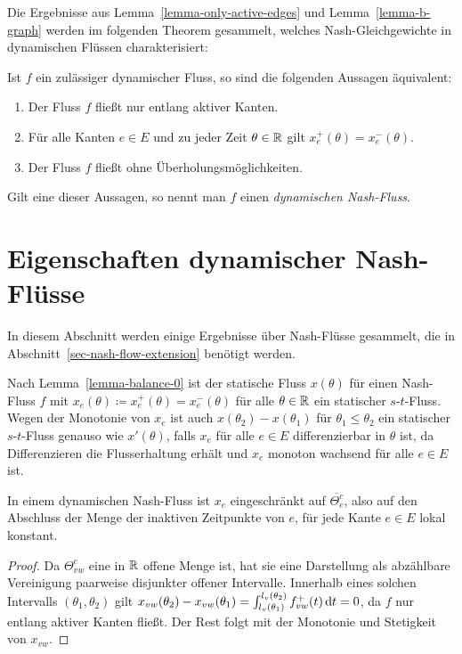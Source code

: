 Die Ergebnisse aus Lemma~\ref{lemma-only-active-edges} und Lemma~\ref{lemma-b-graph} werden im folgenden Theorem gesammelt, welches Nash-Gleichgewichte in dynamischen Flüssen charakterisiert:

\begin{theorem}\label{thm-equivalencies-nash-flow}
	Ist $f$ ein zu\-läs\-siger dynamischer Fluss, so sind die folgenden Aussagen äquivalent:
	\begin{enumerate}[label=(\roman*)]
		\item Der Fluss $f$ fließt nur entlang aktiver Kanten.
		\item Für alle Kanten $e\in E$ und zu jeder Zeit $\theta\in\mathbb{R}$ gilt $x_e^+(\theta) = x_e^-(\theta)$.
		\item Der Fluss $f$ fließt ohne Überholungsmöglichkeiten.
	\end{enumerate}
	Gilt eine dieser Aussagen, so nennt man $f$ einen \emph{dynamischen Nash-Fluss}.
\end{theorem}

\section{Eigenschaften dynamischer Nash-Flüsse}

In diesem Abschnitt werden einige Ergebnisse über Nash-Flüsse gesammelt, die in Abschnitt~\ref{sec-nash-flow-extension} benötigt werden.

\begin{remark}\label{remark-s-t-flow}
	Nach Lemma~\ref{lemma-balance-0} ist der statische Fluss $x(\theta)$ für einen Nash-Fluss $f$ mit $x_e(\theta)\coloneq x_e^+(\theta)=x_e^-(\theta)$ für alle $\theta\in\mathbb{R}$ ein statischer $s$-$t$-Fluss.
	Wegen der Monotonie von $x_e$ ist auch $x(\theta_2) - x(\theta_1)$ für $\theta_1 \leq \theta_2$ ein statischer $s$-$t$-Fluss genauso wie $x'(\theta)$, falls $x_e$ für alle $e\in E$ differenzierbar in $\theta$ ist, da Differenzieren die Flusserhaltung erhält und $x_e$ monoton wachsend für alle $e\in E$ ist.
\end{remark}

\begin{lemma}\label{lemma-x-locally-constant}
In einem dynamischen Nash-Fluss ist $x_e$ eingeschränkt auf $\overline{\Theta_e^c}$, also auf den Abschluss der Menge der inaktiven Zeitpunkte von $e$, für jede Kante $e\in E$ lokal konstant.
\end{lemma}
\begin{proof}
Da $\Theta_{vw}^c$ eine in $\mathbb{R}$ offene Menge ist, hat sie eine Darstellung als abzählbare Vereinigung paarweise disjunkter offener Intervalle.
Innerhalb eines solchen Intervalls $(\theta_1, \theta_2)$ gilt $x_{vw}(\theta_2) - x_{vw}(\theta_1) = \int_{l_v(\theta_1)}^{l_v(\theta_2)} f_{vw}^+(t) \mathop{}\!\mathrm{d} t = 0$, da $f$ nur entlang aktiver Kanten fließt.
Der Rest folgt mit der Monotonie und Stetigkeit von $x_{vw}$.
\end{proof}

